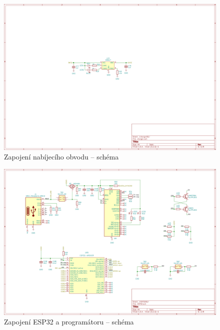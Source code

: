 \begin{figure}
    \centering
    \includegraphics[width=0.93\textheight, angle=90]{kapitoly/ctvrta_elektronicka_varianta/E4_zapojeni/nabijecka.png}
    \caption{Zapojení nabíjecího obvodu -- schéma}
    \label{fig:E4-sch_nabijecka}
\end{figure}
\begin{figure}
    \centering
    \includegraphics[width=0.93\textheight, angle=90]{kapitoly/ctvrta_elektronicka_varianta/E4_zapojeni/ESP32.png}
    \caption{Zapojení ESP32 a programátoru -- schéma}
    \label{fig:E4-sch_ESP32}
\end{figure}
